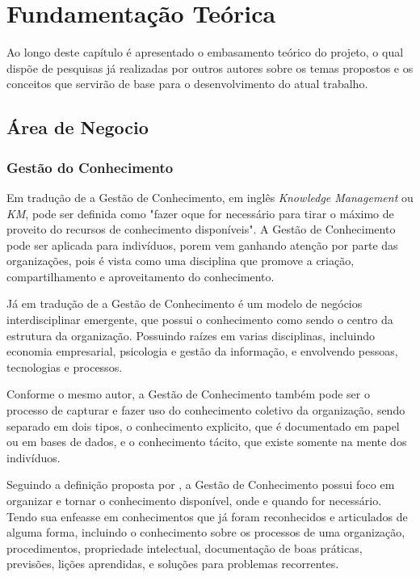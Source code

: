 
\chapter{Fundamentação Teórica}\label{chap:background}
Ao longo deste capítulo é apresentado o embasamento teórico do projeto,
o qual dispõe de pesquisas já realizadas por outros autores sobre os temas
propostos e os conceitos que servirão de base para o desenvolvimento do
atual trabalho.

\section{Área de Negocio}\label{sec:business}
\subsection{Gestão do Conhecimento}

Em tradução de \cite[p. 4]{2014:Becerra} a Gestão de Conhecimento,
em inglês \emph{Knowledge Management} ou \emph{KM}, pode ser definida
como "fazer oque for necessário para tirar o máximo de proveito do
recursos de conhecimento disponíveis". A Gestão de Conhecimento pode
ser aplicada para indivíduos, porem vem ganhando atenção por parte
das organizações, pois é vista como uma disciplina que promove
a criação, compartilhamento e aproveitamento do conhecimento.

Já em tradução de \citep[p. 26]{2007:Awad} a Gestão de Conhecimento
é um modelo de negócios interdisciplinar emergente, que possui
o conhecimento como sendo o centro da estrutura da organização.
Possuindo raízes em varias disciplinas, incluindo economia empresarial,
psicologia e gestão da informação, e envolvendo pessoas, tecnologias e
processos.

Conforme o mesmo autor, a Gestão de Conhecimento também pode ser
o processo de capturar e fazer uso do conhecimento coletivo da organização,
sendo separado em dois tipos, o conhecimento explicito, que é documentado
em papel ou em bases de dados, e o conhecimento tácito, que existe
somente na mente dos indivíduos.

Seguindo a definição proposta por \cite{2014:Becerra}, a
Gestão de Conhecimento possui foco em organizar e tornar o
conhecimento disponível, onde e quando for necessário.
Tendo sua enfeasse em conhecimentos que já foram reconhecidos e
articulados de alguma forma, incluindo o conhecimento sobre os
processos de uma organização, procedimentos, propriedade intelectual,
documentação de boas práticas, previsões, lições aprendidas, e soluções
para problemas recorrentes.


